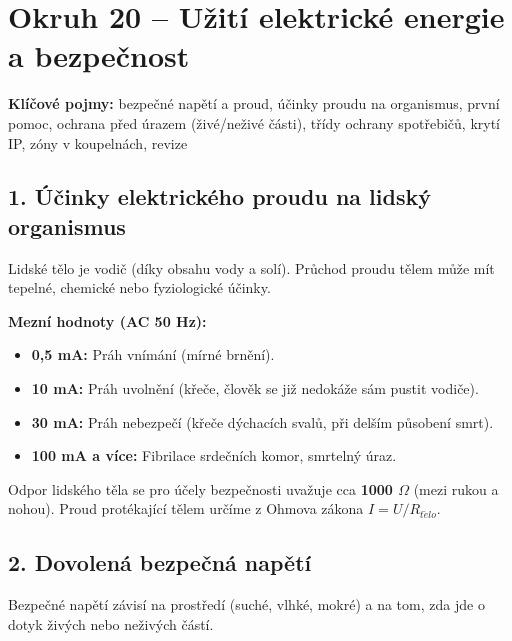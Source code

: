 \documentclass[a4paper,10pt]{article}
\begin{document}
\section*{\large Okruh 20 – Užití elektrické energie a bezpečnost}

\begin{pojmybox}
\textbf{Klíčové pojmy:}
bezpečné napětí a proud, účinky proudu na organismus, první pomoc, ochrana před úrazem (živé/neživé části), třídy ochrany spotřebičů, krytí IP, zóny v koupelnách, revize
\end{pojmybox}

\begin{vysvetlenibox}

\subsection*{1. Účinky elektrického proudu na lidský organismus}

Lidské tělo je vodič (díky obsahu vody a solí). Průchod proudu tělem může mít tepelné, chemické nebo fyziologické účinky.

\textbf{Mezní hodnoty (AC 50 Hz):}
\begin{itemize}
    \item \textbf{0,5 mA:} Práh vnímání (mírné brnění).
    \item \textbf{10 mA:} Práh uvolnění (křeče, člověk se již nedokáže sám pustit vodiče).
    \item \textbf{30 mA:} Práh nebezpečí (křeče dýchacích svalů, při delším působení smrt).
    \item \textbf{100 mA a více:} Fibrilace srdečních komor, smrtelný úraz.
\end{itemize}

\begin{vzorcebox}
Odpor lidského těla se pro účely bezpečnosti uvažuje cca \textbf{1000 $\Omega$} (mezi rukou a nohou). Proud protékající tělem určíme z Ohmova zákona $I = U / R_{t\check{e}lo}$.
\end{vzorcebox}

\subsection*{2. Dovolená bezpečná napětí}

Bezpečné napětí závisí na prostředí (suché, vlhké, mokré) a na tom, zda jde o dotyk živých nebo neživých částí.


\end{vysvetlenibox}
\end{document}
